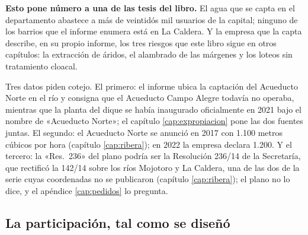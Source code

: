\begin{cautela}
\textbf{Esto pone número a una de las tesis del libro.} El agua que se capta en el departamento abastece a más de veintidós mil usuarios de la capital; ninguno de los barrios que el informe enumera está en La Caldera. Y la empresa que la capta describe, en su propio informe, los tres riesgos que este libro sigue en otros capítulos: la extracción de áridos, el alambrado de las márgenes y los loteos sin tratamiento cloacal.

Tres datos piden cotejo. El primero: el informe ubica la captación del Acueducto Norte en el río y consigna que el Acueducto Campo Alegre todavía no operaba, mientras que la planta del dique se había inaugurado oficialmente en 2021 bajo el nombre de «Acueducto Norte»; el capítulo \ref{cap:expropiacion} pone las dos fuentes juntas. El segundo: el Acueducto Norte se anunció en 2017 con 1.100 metros cúbicos por hora (capítulo \ref{cap:ribera}); en 2022 la empresa declara 1.200. Y el tercero: la «Res.\ 236» del plano podría ser la Resolución 236/14 de la Secretaría, que rectificó la 142/14 sobre los ríos Mojotoro y La Caldera, una de las dos de la serie cuyas coordenadas no se publicaron (capítulo \ref{cap:ribera}); el plano no lo dice, y el apéndice \ref{cap:pedidos} lo pregunta.
\end{cautela}

\subsection*{La participación, tal como se diseñó}

